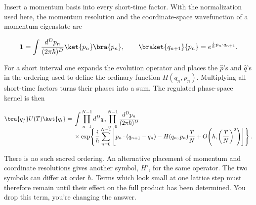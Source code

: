 Insert a momentum basis into every short-time factor.  With the normalization
used here, the momentum resolution and the coordinate-space wavefunction of a
momentum eigenstate are

\begin{equation}
  \mathbf 1
  =\int\frac{d^Dp_n}{(2\pi\hbar)^D}\ket{p_n}\bra{p_n},
  \qquad
  \braket{q_{n+1}}{p_n}
  =e^{\frac{i}{\hbar}p_n\cdot q_{n+1}}.
  \label{eq:proposal-momentum-resolution}
\end{equation}

For a short interval one expands the evolution operator and places the
$\hat p$'s and $\hat q$'s in the ordering used to define the ordinary function
$H(q_n,p_n)$.  Multiplying all short-time factors turns their phases into a
sum.  The regulated phase-space kernel is then

\begin{align}
  \bra{q_f}U(T)\ket{q_i}
  ={}&\int\prod_{n=1}^{N-1}d^Dq_n
  \prod_{n=0}^{N-1}\frac{d^Dp_n}{(2\pi\hbar)^D}
  \nonumber\\[-2mm]
  &\times
  \exp\!\left\{
  \frac{i}{\hbar}\sum_{n=0}^{N-1}
  \left[
    p_n\cdot(q_{n+1}-q_n)
    -H(q_n,p_n)\frac{T}{N}
    +O\!\left(\hbar,\left(\frac{T}{N}\right)^2\right)
  \right]\right\}.
  \label{eq:proposal-finite-phase-space-kernel}
\end{align}


There is no such sacred ordering.  An alternative placement of momentum and
coordinate resolutions gives another symbol, $H'$, for the same operator.
The two symbols can differ at order $\hbar$.  Terms which look small at one
lattice step must therefore remain until their effect on the full product has
been determined.  You drop this term, you're changing the answer.

